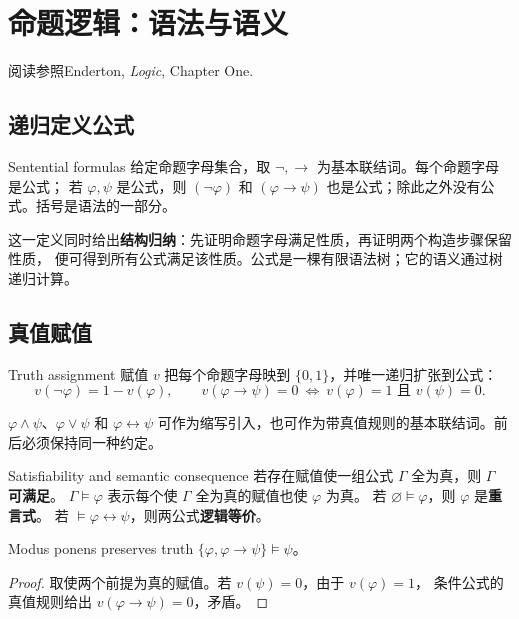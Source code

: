 \chapter{命题逻辑：语法与语义}
\begin{qlnote}{阅读参照}Enderton, \emph{Logic}, Chapter One.\end{qlnote}

\section{递归定义公式}
\begin{definition}{Sentential formulas}
给定命题字母集合，取 \(\neg,\to\) 为基本联结词。每个命题字母是公式；
若 \(\varphi,\psi\) 是公式，则 \((\neg\varphi)\) 和 \((\varphi\to\psi)\)
也是公式；除此之外没有公式。括号是语法的一部分。
\end{definition}
这一定义同时给出\textbf{结构归纳}：先证明命题字母满足性质，再证明两个构造步骤保留性质，
便可得到所有公式满足该性质。公式是一棵有限语法树；它的语义通过树递归计算。

\section{真值赋值}
\begin{definition}{Truth assignment}
赋值 \(v\) 把每个命题字母映到 \(\{0,1\}\)，并唯一递归扩张到公式：
\[
 v(\neg\varphi)=1-v(\varphi),\qquad
 v(\varphi\to\psi)=0\ \Longleftrightarrow\
 v(\varphi)=1\text{ 且 }v(\psi)=0.
\]
\end{definition}
\(\varphi\land\psi\)、\(\varphi\lor\psi\) 和 \(\varphi\leftrightarrow\psi\)
可作为缩写引入，也可作为带真值规则的基本联结词。前后必须保持同一种约定。

\begin{definition}{Satisfiability and semantic consequence}
若存在赋值使一组公式 \(\Gamma\) 全为真，则 \(\Gamma\) \textbf{可满足}。
\(\Gamma\models\varphi\) 表示每个使 \(\Gamma\) 全为真的赋值也使 \(\varphi\) 为真。
若 \(\varnothing\models\varphi\)，则 \(\varphi\) 是\textbf{重言式}。
若 \(\models\varphi\leftrightarrow\psi\)，则两公式\textbf{逻辑等价}。
\end{definition}

\begin{theorem}{Modus ponens preserves truth}
\(\{\varphi,\varphi\to\psi\}\models\psi\)。
\end{theorem}
\begin{proof}
取使两个前提为真的赋值。若 \(v(\psi)=0\)，由于 \(v(\varphi)=1\)，
条件公式的真值规则给出 \(v(\varphi\to\psi)=0\)，矛盾。
\end{proof}

